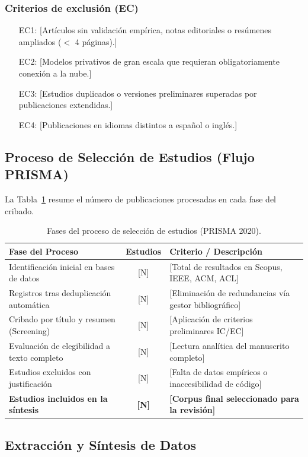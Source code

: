 \subsubsection{Criterios de exclusión (EC)}
\begin{enumerate}[(a)]
	\item [EC1:] [Artículos sin validación empírica, notas editoriales o resúmenes ampliados ($<$ 4 páginas).]
	\item [EC2:] [Modelos privativos de gran escala que requieran obligatoriamente conexión a la nube.]
	\item [EC3:] [Estudios duplicados o versiones preliminares superadas por publicaciones extendidas.]
	\item [EC4:] [Publicaciones en idiomas distintos a español o inglés.]
\end{enumerate}

\subsection{Proceso de Selección de Estudios (Flujo PRISMA)}

La Tabla~\ref{tab:flujo_prisma} resume el número de publicaciones procesadas en cada fase del cribado.

\begin{table}[t]
\centering
\caption{Fases del proceso de selección de estudios (PRISMA 2020).}
\label{tab:flujo_prisma}
\begin{tabularx}{\textwidth}{p{5.5cm} c X}
\toprule
\textbf{Fase del Proceso} & \textbf{Estudios} & \textbf{Criterio / Descripción} \\
\midrule
Identificación inicial en bases de datos & [N] & [Total de resultados en Scopus, IEEE, ACM, ACL] \\
Registros tras deduplicación automática & [N] & [Eliminación de redundancias vía gestor bibliográfico] \\
Cribado por título y resumen (Screening) & [N] & [Aplicación de criterios preliminares IC/EC] \\
Evaluación de elegibilidad a texto completo & [N] & [Lectura analítica del manuscrito completo] \\
Estudios excluidos con justificación & [N] & [Falta de datos empíricos o inaccesibilidad de código] \\
\textbf{Estudios incluidos en la síntesis} & \textbf{[N]} & \textbf{[Corpus final seleccionado para la revisión]} \\
\bottomrule
\end{tabularx}
\end{table}

\subsection{Extracción y Síntesis de Datos}
